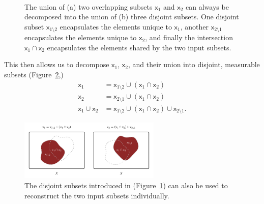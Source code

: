 \documentclass[
  letterpaper,
  DIV=11,
  numbers=noendperiod]{scrartcl}
\begin{document}
\begin{figure}
\begin{minipage}[t]{0.90\linewidth}
{{}

}

\subcaption{\label{fig-disjoint-components}}
\end{minipage}%
%
\begin{minipage}[t]{0.05\linewidth}

{\centering 

~

}

\end{minipage}%

\caption{\label{fig-disjoint-decomposition}The union of (a) two
overlapping subsets \(\mathsf{x}_{1}\) and \(\mathsf{x}_{2}\) can always
be decomposed into the union of (b) three disjoint subsets. One disjoint
subset \(\mathsf{x}_{1 \setminus 2}\) encapsulates the elements unique
to \(\mathsf{x}_{1}\), another \(\mathsf{x}_{2 \setminus 1}\)
encapsulates the elements unique to \(\mathsf{x}_{2}\), and finally the
intersection \(\mathsf{x}_{1} \cap \mathsf{x}_{2}\) encapsulates the
elements shared by the two input subsets.}

\end{figure}

This then allows us to decompose \(\mathsf{x}_{1}\), \(\mathsf{x}_{2}\),
and their union into disjoint, measurable subsets
(Figure~\ref{fig-input-reconstruction},) \begin{align*}
\mathsf{x}_{1} &=
\mathsf{x}_{1 \setminus 2} \cup (\mathsf{x}_{1} \cap \mathsf{x}_{2})
\\
\mathsf{x}_{2} &=
\mathsf{x}_{2 \setminus 1} \cup (\mathsf{x}_{1} \cap \mathsf{x}_{2})
\\
\mathsf{x}_{1} \cup \mathsf{x}_{2} &=
\mathsf{x}_{1 \setminus 2}
\cup
( \mathsf{x}_{1} \cap \mathsf{x}_{2} )
\cup
\mathsf{x}_{2 \setminus 1}.
\end{align*}

\begin{figure}

{\centering \includegraphics[width=0.6\textwidth,height=\textheight]{figures/overlapping_sets/input_reconstruction/input_reconstruction.pdf}

}

\caption{\label{fig-input-reconstruction}The disjoint subsets introduced
in (Figure~\ref{fig-disjoint-decomposition}) can also be used to
reconstruct the two input subsets individually.}

\end{figure}
\end{document}
